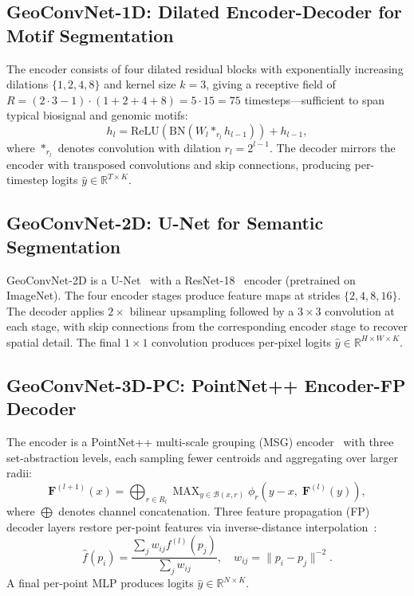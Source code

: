 \documentclass[10pt,conference]{IEEEtran}
\newcommand{\R}{\mathbb{R}}
\newcommand{\bF}{\mathbf{F}}
\DeclareMathOperator{\MAX}{MAX}
\begin{document}
\subsection{GeoConvNet-1D: Dilated Encoder-Decoder for Motif Segmentation}

The encoder consists of four dilated residual blocks with exponentially
increasing dilations $\{1,2,4,8\}$ and kernel size $k{=}3$, giving a
receptive field of $R = (2\cdot3-1)\cdot(1+2+4+8) = 5\cdot15 = 75$
timesteps---sufficient to span typical biosignal and genomic motifs:
\begin{equation}
  h_l = \mathrm{ReLU}(\mathrm{BN}(W_l *_{r_l} h_{l-1})) + h_{l-1},
\end{equation}
where $*_{r_l}$ denotes convolution with dilation $r_l{=}2^{l-1}$.  The
decoder mirrors the encoder with transposed convolutions and skip
connections, producing per-timestep logits $\hat{y}\in\R^{T\times K}$.

\subsection{GeoConvNet-2D: U-Net for Semantic Segmentation}

GeoConvNet-2D is a U-Net~\cite{ronneberger2015unet} with a
ResNet-18~\cite{he2016deep} encoder (pretrained on ImageNet).  The four
encoder stages produce feature maps at strides $\{2,4,8,16\}$.  The
decoder applies $2\times$ bilinear upsampling followed by a $3{\times}3$
convolution at each stage, with skip connections from the corresponding
encoder stage to recover spatial detail.  The final $1{\times}1$
convolution produces per-pixel logits $\hat{y}\in\R^{H\times W\times K}$.

\subsection{GeoConvNet-3D-PC: PointNet++ Encoder-FP Decoder}

The encoder is a PointNet++ multi-scale grouping (MSG) encoder~\cite{qi2017pointnetplusplus}
with three set-abstraction levels, each sampling fewer centroids and
aggregating over larger radii:
\begin{equation}
  \bF^{(l+1)}(x)
    = \bigoplus_{r\in R_l}
      \MAX_{y\in\mathcal{B}(x,r)} \phi_r(y-x,\;\bF^{(l)}(y)),
  \label{eq:msg}
\end{equation}
where $\bigoplus$ denotes channel concatenation.  Three feature propagation
(FP) decoder layers restore per-point features via inverse-distance
interpolation~\cite{qi2017pointnetplusplus}:
\begin{equation}
  \hat{f}(p_i) = \frac{\sum_j w_{ij} f^{(l)}(p_j)}{\sum_j w_{ij}},
  \quad w_{ij} = \|p_i - p_j\|^{-2}.
  \label{eq:fp}
\end{equation}
A final per-point MLP produces logits $\hat{y}\in\R^{N\times K}$.
\end{document}
